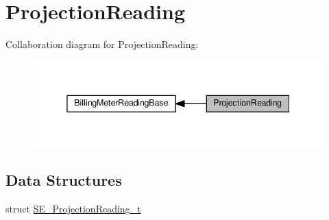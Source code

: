 \hypertarget{group__ProjectionReading}{}\section{Projection\+Reading}
\label{group__ProjectionReading}
Collaboration diagram for Projection\+Reading\+:\nopagebreak
\begin{figure}[H]
\begin{center}
\leavevmode
\includegraphics[width=338pt]{group__ProjectionReading}
\end{center}
\end{figure}
\subsection*{Data Structures}
\begin{DoxyCompactItemize}
\item 
struct \hyperlink{structSE__ProjectionReading__t}{S\+E\+\_\+\+Projection\+Reading\+\_\+t}
\end{DoxyCompactItemize}
